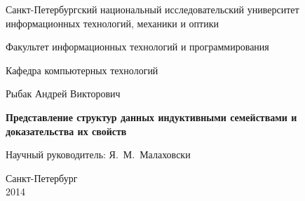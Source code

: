 \documentclass[a4paper,oneside]{report}
\begin{document}
\initializefrontsections

\pagestyle{title}

\begin{center}
Санкт-Петербургский национальный исследовательский университет \\ информационных технологий, механики и оптики

\vspace{2cm}

Факультет информационных технологий и программирования

Кафедра компьютерных технологий

\vspace{3cm}

{\Large Рыбак Андрей Викторович}

\vspace{2cm}

\vbox{\LARGE\bfseries
Представление структур данных индуктивными семействами и доказательства их свойств
}

\vspace{4cm}

{\Large Научный руководитель: Я.~М.~Малаховски}

\vspace{6cm}
Санкт-Петербург\\ 2014
\end{center}

\newpage
\setcounter{page}{3}
\pagestyle{plain}

\tableofcontents

\startthechapters



% 


\printbibliography
\end{document}

